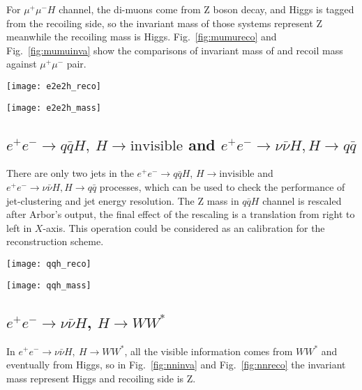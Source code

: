 \documentclass[a4paper,10pt,twoside]{cpc-hepnp}
\begin{document}
For $\mu^+\mu^-H$ channel, the di-muons come from Z boson decay, and Higgs is tagged from the recoiling side, so the invariant mass of those systems represent Z meanwhile the recoiling mass is Higgs.
Fig.~\ref{fig:mumureco} and Fig.~\ref{fig:mumuinva} show the comparisons of invariant mass of and recoil mass against $\mu^+\mu^-$ pair.

\begin{center}
\texttt{[image: e2e2h\_reco]}
\end{center}
\begin{center}
\texttt{[image: e2e2h\_mass]}
\end{center}

\subsection{$e^+e^-\to q\bar{q}H,~H \to\mbox{invisible}$ and $e^+e^-\to \nu\bar{\nu}H, H\to q\bar{q}$}

There are only two jets in the $e^+e^-\to q\bar{q}H$, $H \to\mbox{invisible}$ and $e^+e^-\to \nu\bar{\nu}H, H\to q\bar{q}$ processes, which can be used to check the performance of jet-clustering and jet energy resolution.
The Z mass in $q\bar{q}H$ channel is rescaled after Arbor's output, the final effect of the rescaling is a translation from right to left in $X$-axis. This operation could be considered as an calibration for the reconstruction scheme.


\begin{center}
\texttt{[image: qqh\_reco]}
\end{center}
\begin{center}
\texttt{[image: qqh\_mass]}
\end{center}

\subsection{$e^+e^-\to \nu\bar{\nu}H$, $H \to WW^*$}
In $e^+e^- \to \nu\bar{\nu}H,~H\to WW^*$,  all the visible information comes from $WW^*$ and eventually from Higgs, so in Fig.~\ref{fig:nninva} and Fig.~\ref{fig:nnreco} the invariant mass represent Higgs and recoiling side is Z.
\end{document}
